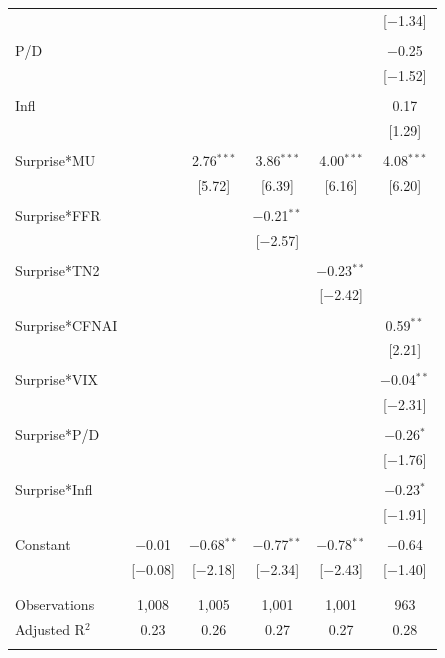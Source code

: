\documentclass[12pt]{article}
\begin{document}
\begin{table}[!htbp]
{\begin{tabular}{@{\extracolsep{5pt}}lccccc}
  &  &  &  &  & [$-$1.34] \\ 
  & & & & & \\ 
 P/D &  &  &  &  & $-$0.25 \\ 
  &  &  &  &  & [$-$1.52] \\ 
  & & & & & \\ 
 Infl &  &  &  &  & 0.17 \\ 
  &  &  &  &  & [1.29] \\ 
  & & & & & \\ 
 Surprise*MU &  & 2.76$^{***}$ & 3.86$^{***}$ & 4.00$^{***}$ & 4.08$^{***}$ \\
  &  & [5.72] & [6.39] & [6.16] & [6.20] \\ 
  & & & & & \\ 
 Surprise*FFR &  &  & $-$0.21$^{**}$ &  &  \\ 
  &  &  & [$-$2.57] &  &  \\ 
  & & & & & \\ 
 Surprise*TN2 &  &  &  & $-$0.23$^{**}$ &  \\ 
  &  &  &  & [$-$2.42] &  \\ 
  & & & & & \\ 
 Surprise*CFNAI &  &  &  &  & 0.59$^{**}$ \\ 
  &  &  &  &  & [2.21] \\ 
  & & & & & \\ 
 Surprise*VIX &  &  &  &  & $-$0.04$^{**}$ \\ 
  &  &  &  &  & [$-$2.31] \\ 
  & & & & & \\ 
 Surprise*P/D &  &  &  &  & $-$0.26$^{*}$ \\ 
  &  &  &  &  & [$-$1.76] \\ 
  & & & & & \\ 
 Surprise*Infl &  &  &  &  & $-$0.23$^{*}$ \\ 
  &  &  &  &  & [$-$1.91] \\ 
  & & & & & \\ 
 Constant & $-$0.01 & $-$0.68$^{**}$ & $-$0.77$^{**}$ & $-$0.78$^{**}$ & $-$0.64 \\ 
  & [$-$0.08] & [$-$2.18] & [$-$2.34] & [$-$2.43] & [$-$1.40] \\ 
  & & & & & \\ 
\hline \\[-1.8ex] 
Observations & 1,008 & 1,005 & 1,001 & 1,001 & 963 \\ 
Adjusted R$^{2}$ & 0.23 & 0.26 & 0.27 & 0.27 & 0.28 \\ 
\hline 
\hline \\[-1.8ex] 
\end{tabular}  
}
\end{table}
\end{document}
